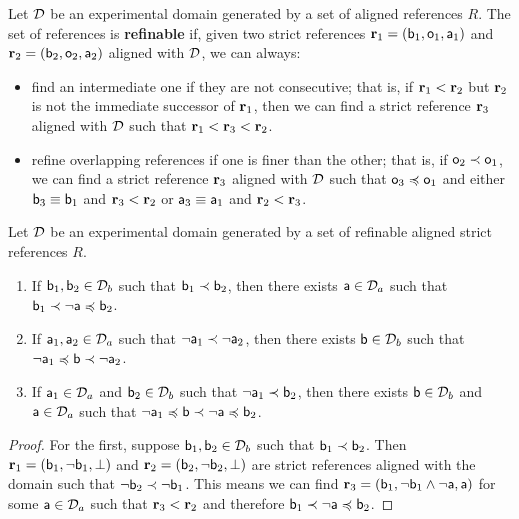 \documentclass[11pt,letterpaper,fleqn]{memoir} %
\begin{document}
\begin{mathSection}
\begin{defn}
	Let $\edomain$ be an experimental domain generated by a set of aligned references $R$. The set of references is \textbf{refinable} if, given two strict references $\refStmt_1 = ( \stmt[b]_1, \stmt[o]_1, \stmt[a]_1)$ and $\refStmt_2 = ( \stmt[b]_2, \stmt[o]_2, \stmt[a]_2)$ aligned with $\edomain$, we can always:
	\begin{itemize}
		\item find an intermediate one if they are not consecutive; that is, if $\refStmt[r]_1 < \refStmt[r]_2$ but $\refStmt[r]_2$ is not the immediate successor of $\refStmt[r]_1$, then we can find a strict reference $\refStmt_3$ aligned with $\edomain$ such that $\refStmt[r]_1 < \refStmt[r]_3 < \refStmt[r]_2$.
		\item refine overlapping references if one is finer than the other; that is, if $\stmt[o]_2 \snarrower \stmt[o]_1$, we can find a strict reference $\refStmt_3$ aligned with $\edomain$ such that $\stmt[o]_3 \narrower \stmt[o]_1$ and either $\stmt[b]_3 \equiv \stmt[b]_1$ and $\refStmt_3 < \refStmt_2$ or $\stmt[a]_3 \equiv \stmt[a]_1$ and $\refStmt_2 < \refStmt_3$.
	\end{itemize}
\end{defn}

\begin{prop}\label{3_prop_refinable_order_sequences}
	Let $\edomain$ be an experimental domain generated by a set of refinable aligned strict references $R$.
	\begin{enumerate}
		\item If $\stmt[b]_1, \stmt[b]_2 \in \edomain_b$ such that $\stmt[b]_1 \snarrower \stmt[b]_2$, then there exists $\stmt[a] \in \edomain_a$ such that $\stmt[b]_1 \snarrower \NOT \stmt[a] \narrower \stmt[b]_2$.
		\item If $\stmt[a]_1, \stmt[a]_2 \in \edomain_a$ such that $\NOT \stmt[a]_1 \snarrower \NOT \stmt[a]_2$, then there exists $\stmt[b] \in \edomain_b$ such that $\NOT \stmt[a]_1 \narrower \stmt[b] \snarrower \NOT \stmt[a]_2$.
		\item If $\stmt[a]_1 \in \edomain_a$ and $\stmt[b]_2\in \edomain_b$ such that $\NOT \stmt[a]_1 \snarrower \stmt[b]_2$, then there exists $\stmt[b] \in \edomain_b$ and $\stmt[a] \in \edomain_a$ such that $\NOT \stmt[a]_1 \narrower \stmt[b] \snarrower \NOT \stmt[a] \narrower \stmt[b]_2$.
	\end{enumerate}
\end{prop}
\begin{proof}
	For the first, suppose $\stmt[b]_1, \stmt[b]_2 \in \edomain_b$ such that $\stmt[b]_1 \snarrower \stmt[b]_2$. Then $\refStmt_1 = ( \stmt[b]_1, \NOT \stmt[b]_1, \contradiction )$ and  $\refStmt_2 = ( \stmt[b]_2, \NOT \stmt[b]_2, \contradiction)$ are strict references aligned with the domain such that $\NOT \stmt[b]_2 \snarrower \NOT \stmt[b]_1$. This means we can find $\refStmt_3 = ( \stmt[b]_1, \NOT \stmt[b]_1 \AND \NOT \stmt[a], \stmt[a] )$ for some $\stmt[a] \in \edomain_a$ such that $\refStmt_3 < \refStmt_2$ and therefore $\stmt[b]_1 \snarrower \NOT \stmt[a] \narrower \stmt[b]_2$.
	

\end{proof}
\end{mathSection}
\end{document}
